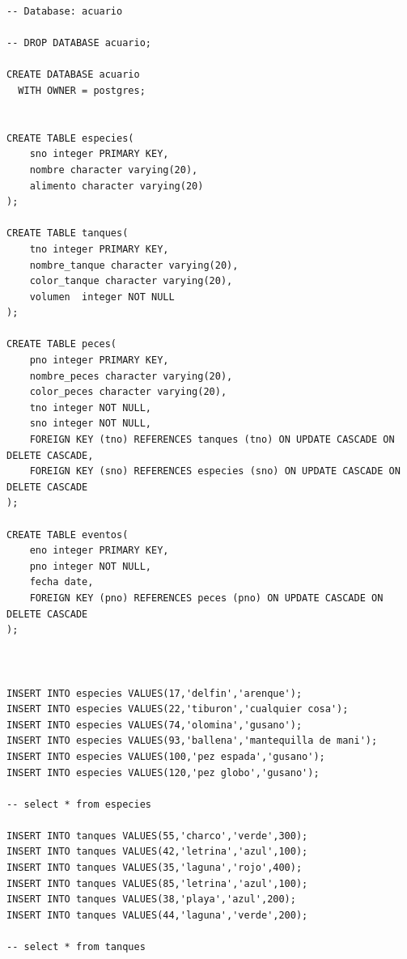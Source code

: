 \documentclass[letter,12pt]{report}
\begin{document}
   \vspace{-0.8cm}
\begin{lstlisting}
-- Database: acuario

-- DROP DATABASE acuario;

CREATE DATABASE acuario
  WITH OWNER = postgres;


CREATE TABLE especies(
    sno integer PRIMARY KEY,
    nombre character varying(20),
    alimento character varying(20)
);

CREATE TABLE tanques(
    tno integer PRIMARY KEY,
    nombre_tanque character varying(20),
    color_tanque character varying(20),
    volumen  integer NOT NULL
);

CREATE TABLE peces(
    pno integer PRIMARY KEY,
    nombre_peces character varying(20),
    color_peces character varying(20),
    tno integer NOT NULL,
    sno integer NOT NULL,
    FOREIGN KEY (tno) REFERENCES tanques (tno) ON UPDATE CASCADE ON DELETE CASCADE,
    FOREIGN KEY (sno) REFERENCES especies (sno) ON UPDATE CASCADE ON DELETE CASCADE
);

CREATE TABLE eventos(
    eno integer PRIMARY KEY,
    pno integer NOT NULL,
    fecha date,
    FOREIGN KEY (pno) REFERENCES peces (pno) ON UPDATE CASCADE ON DELETE CASCADE
);



INSERT INTO especies VALUES(17,'delfin','arenque');
INSERT INTO especies VALUES(22,'tiburon','cualquier cosa');
INSERT INTO especies VALUES(74,'olomina','gusano');
INSERT INTO especies VALUES(93,'ballena','mantequilla de mani');
INSERT INTO especies VALUES(100,'pez espada','gusano');
INSERT INTO especies VALUES(120,'pez globo','gusano');

-- select * from especies

INSERT INTO tanques VALUES(55,'charco','verde',300);
INSERT INTO tanques VALUES(42,'letrina','azul',100);
INSERT INTO tanques VALUES(35,'laguna','rojo',400);
INSERT INTO tanques VALUES(85,'letrina','azul',100);
INSERT INTO tanques VALUES(38,'playa','azul',200);
INSERT INTO tanques VALUES(44,'laguna','verde',200);

-- select * from tanques



\end{lstlisting}
\end{document}
